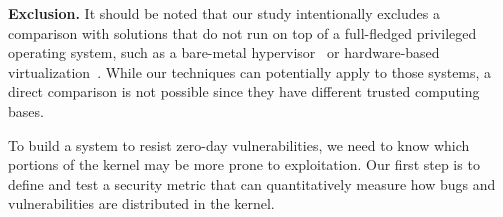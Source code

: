 \noindent
\textbf{Exclusion.}
It should be noted that our study intentionally excludes %
a comparison with solutions that do not run on top of a 
full-fledged privileged operating system, such as 
a bare-metal hypervisor~\cite{Xen-03, VMWare-Server} or 
hardware-based virtualization~\cite{IntelVT, keller2010nohype}. 
While our techniques can potentially apply to those 
systems, a direct comparison is not possible since they have different
trusted computing bases.

To build a system to resist zero-day vulnerabilities, we need to know which
portions of the kernel may be more prone to exploitation. Our first step is to
define and test a security metric that can quantitatively measure how bugs and
vulnerabilities are distributed in the kernel.
